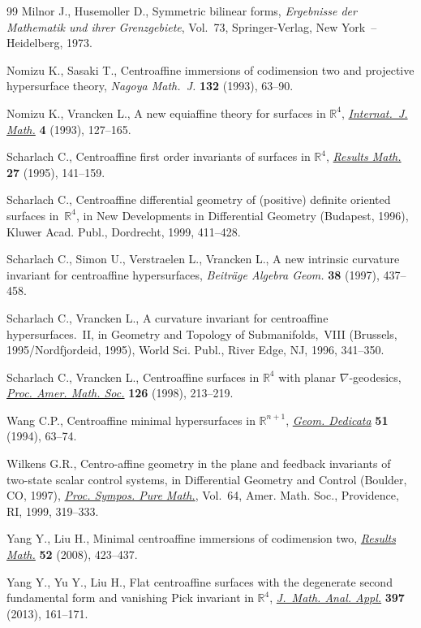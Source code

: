 \documentclass[pdftex]{sigma}
\numberwithin{equation}{section}
\theoremstyle{definition}
\begin{document}
\begin{thebibliography}{99}
Milnor J., Husemoller D., Symmetric bilinear forms, \textit{Ergebnisse der
  Mathematik und ihrer Grenzgebiete}, Vol.~73, Springer-Verlag, New York~--
  Heidelberg, 1973.

Nomizu K., Sasaki T., Centroaffine immersions of codimension two and projective
  hypersurface theory, \textit{Nagoya Math.~J.} \textbf{132} (1993), 63--90.

Nomizu K., Vrancken L., A new equiaffine theory for surfaces in {${\mathbb
  R}^4$}, \href{http://dx.doi.org/10.1142/S0129167X9300008X}{\textit{Internat.~J. Math.}} \textbf{4} (1993), 127--165.

Scharlach C., Centroaffine first order invariants of surfaces in {${\mathbb
  R}^4$}, \href{http://dx.doi.org/10.1007/BF03322278}{\textit{Results Math.}} \textbf{27} (1995), 141--159.

Scharlach C., Centroaffine differential geometry of (positive) definite
  oriented surfaces in~{${\mathbb R}^4$}, in New De\-ve\-lop\-ments in Differential
  Geometry ({B}udapest, 1996), Kluwer Acad. Publ., Dordrecht, 1999, 411--428.

Scharlach C., Simon U., Verstraelen L., Vrancken L., A new intrinsic curvature
  invariant for centroaffine hypersurfaces, \textit{Beitr\"age Algebra Geom.}
  \textbf{38} (1997), 437--458.

Scharlach C., Vrancken L., A curvature invariant for centroaffine
  hypersurfaces.~{II}, in Geometry and Topo\-lo\-gy of Submanifolds,~{VIII}
  ({B}russels, 1995/{N}ordfjordeid, 1995), World Sci. Publ., River Edge, NJ,
  1996, 341--350.

Scharlach C., Vrancken L., Centroaffine surfaces in {${\mathbb R}^4$} with
  planar {$\nabla$}-geodesics, \href{http://dx.doi.org/10.1090/S0002-9939-98-04408-6}{\textit{Proc. Amer. Math. Soc.}} \textbf{126}
  (1998), 213--219.

Wang C.P., Centroaffine minimal hypersurfaces in {${\mathbb R}^{n+1}$},
  \href{http://dx.doi.org/10.1007/BF01264101}{\textit{Geom. Dedicata}} \textbf{51} (1994), 63--74.

Wilkens G.R., Centro-affine geometry in the plane and feedback invariants of
  two-state scalar control systems, in Differential Geometry and Control
  ({B}oulder, {CO}, 1997), \href{http://dx.doi.org/10.1090/pspum/064/1654544}{\textit{Proc. Sympos. Pure Math.}}, Vol.~64, Amer.
  Math. Soc., Providence, RI, 1999, 319--333.

Yang Y., Liu H., Minimal centroaffine immersions of codimension two,
  \href{http://dx.doi.org/10.1007/s00025-008-0321-5}{\textit{Results Math.}} \textbf{52} (2008), 423--437.

Yang Y., Yu Y., Liu H., Flat centroaffine surfaces with the degenerate second
  fundamental form and vani\-shing {P}ick invariant in {$\mathbb{R}^4$},
  \href{http://dx.doi.org/10.1016/j.jmaa.2012.07.047}{\textit{J.~Math. Anal. Appl.}} \textbf{397} (2013), 161--171.

\end{thebibliography}\LastPageEnding
\end{document}
